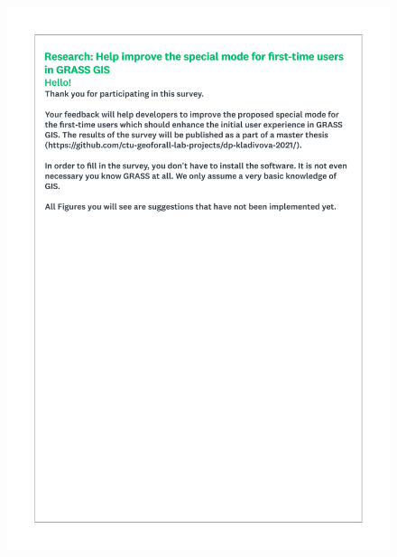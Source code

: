 \documentclass[a4paper,10pt,twoside]{article}
\begin{document}
 \begin{figure}[hbt!]
 \begin{center}
 \includegraphics[width=12cm]{../surveys/questionnaires/survey2-page1_intro.pdf}
 \end{center}
 \end{figure}
 
\end{document}
